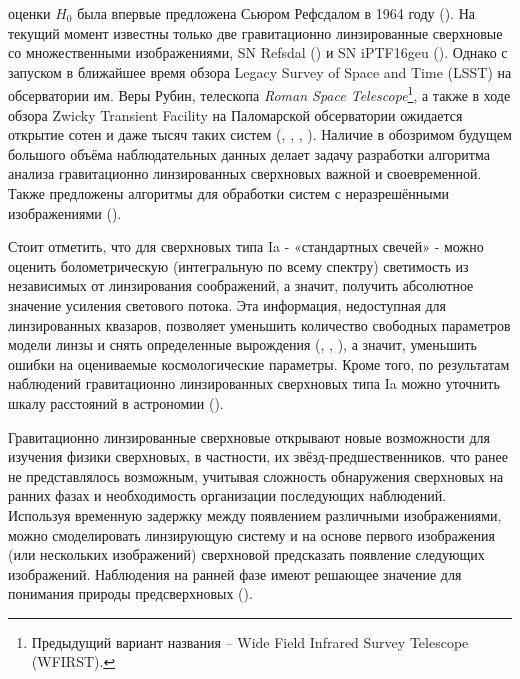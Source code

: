 оценки $H_0$ была впервые предложена Сьюром Рефсдалом в 1964 году (\cite{refsdal1964}). На текущий момент известны только две гравитационно линзированные сверхновые со множественными изображениями, SN Refsdal (\cite{kelly2014}) и SN iPTF16geu (\cite{goobar2017}). Однако с запуском в ближайшее время обзора Legacy Survey of Space and Time (LSST) на обсерватории им. Веры Рубин, телескопа \textit{Roman Space Telescope}\footnote{Предыдущий вариант названия -- Wide Field Infrared Survey Telescope (WFIRST).}, а также в ходе обзора Zwicky Transient Facility на Паломарской обсерватории ожидается открытие сотен и даже тысяч таких систем \color[red]{точно тысяч? Про сотни поверю, про тысячи сомневаюсь} (\cite{ogurimarshall}, \cite{goldsteinnugent2017}, \cite{veracrubin}, \cite{rst}). Наличие в обозримом будущем большого объёма наблюдательных данных делает задачу разработки алгоритма анализа гравитационно линзированных сверхновых важной и своевременной. Также предложены алгоритмы для обработки систем с неразрешёнными изображениями (\cite{beitunresolved}). 

Стоит отметить, что для сверхновых типа Ia - «стандартных свечей» - можно оценить болометрическую (интегральную по всему спектру) светимость из независимых от линзирования соображений, а значит, получить абсолютное значение усиления светового потока. Эта информация, недоступная для линзированных квазаров, позволяет уменьшить количество свободных параметров модели линзы и снять определенные вырождения (\cite{falco1985}, \cite{holz2001}, \cite{ogurikawano2003}), а значит, уменьшить ошибки на  оцениваемые космологические параметры. Кроме того, по результатам наблюдений гравитационно линзированных сверхновых типа Ia можно уточнить шкалу расстояний в астрономии (\cite{ddr}).

Гравитационно линзированные сверхновые открывают новые возможности для изучения физики сверхновых, в частности, их звёзд-предшественников.  %
что ранее не представлялось возможным, учитывая сложность обнаружения сверхновых на ранних фазах и необходимость организации последующих наблюдений. Используя временную задержку между появлением различными изображениями, можно смоделировать линзирующую систему и на основе первого изображения (или нескольких изображений) сверхновой предсказать  появление следующих изображений. Наблюдения на ранней фазе имеют решающее значение для понимания природы предсверхновых (\cite{holismokesI}).
